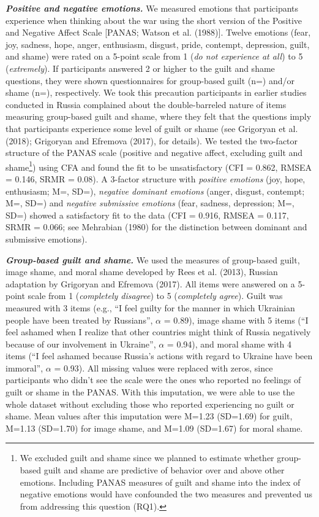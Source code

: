 \documentclass[
]{article}
\begin{document}
\textbf{\emph{Positive and negative emotions.}} We measured emotions that participants experience when thinking about the war using the short version of the Positive and Negative Affect Scale {[}PANAS; Watson et al. (1988){]}. Twelve emotions (fear, joy, sadness, hope, anger, enthusiasm, disgust, pride, contempt, depression, guilt, and shame) were rated on a 5-point scale from 1 (\emph{do not experience at all}) to 5 (\emph{extremely}). If participants answered 2 or higher to the guilt and shame questions, they were shown questionnaires for group-based guilt (n=) and/or shame (n=), respectively. We took this precaution participants in earlier studies conducted in Russia complained about the double-barreled nature of items measuring group-based guilt and shame, where they felt that the questions imply that participants experience some level of guilt or shame (see Grigoryan et al. (2018); Grigoryan and Efremova (2017), for details). We tested the two-factor structure of the PANAS scale (positive and negative affect, excluding guilt and shame\footnote{We excluded guilt and shame since we planned to estimate whether group-based guilt and shame are predictive of behavior over and above other emotions. Including PANAS measures of guilt and shame into the index of negative emotions would have confounded the two measures and prevented us from addressing this question (RQ1).}) using CFA and found the fit to be unsatisfactory (CFI = 0.862, RMSEA = 0.146, SRMR = 0.08). A 3-factor structure with \emph{positive emotions} (joy, hope, enthusiasm; M=, SD=), \emph{negative dominant emotions} (anger, disgust, contempt; M=, SD=) and \emph{negative submissive emotions} (fear, sadness, depression; M=, SD=) showed a satisfactory fit to the data (CFI = 0.916, RMSEA = 0.117, SRMR = 0.066; see Mehrabian (1980) for the distinction between dominant and submissive emotions).

\textbf{\emph{Group-based guilt and shame.}} We used the measures of group-based guilt, image shame, and moral shame developed by Rees et al. (2013), Russian adaptation by Grigoryan and Efremova (2017). All items were answered on a 5-point scale from 1 (\emph{completely disagree}) to 5 (\emph{completely agree}). Guilt was measured with 3 items (e.g., ``I feel guilty for the manner in which Ukrainian people have been treated by Russians'', \(\alpha\) = 0.89), image shame with 5 items (``I feel ashamed when I realize that other countries might think of Russia negatively because of our involvement in Ukraine'', \(\alpha\) = 0.94), and moral shame with 4 items (``I feel ashamed because Russia's actions with regard to Ukraine have been immoral'', \(\alpha\) = 0.93). All missing values were replaced with zeros, since participants who didn't see the scale were the ones who reported no feelings of guilt or shame in the PANAS. With this imputation, we were able to use the whole dataset without excluding those who reported experiencing no guilt or shame. Mean values after this imputation were M=1.23 (SD=1.69) for guilt, M=1.13 (SD=1.70) for image shame, and M=1.09 (SD=1.67) for moral shame.
\end{document}
